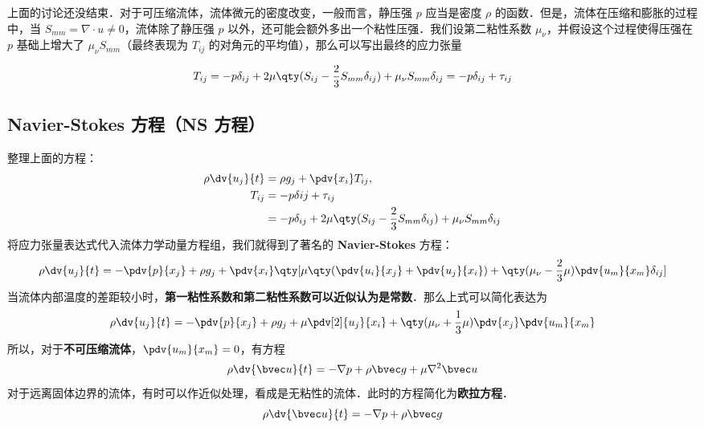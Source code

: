 上面的讨论还没结束．对于可压缩流体，流体微元的密度改变，一般而言，静压强 $p$ 应当是密度 $\rho$ 的函数．但是，流体在压缩和膨胀的过程中，当 $S_{mm}=\nabla\cdot u\neq 0$，流体除了静压强 $p$ 以外，还可能会额外多出一个粘性压强．我们设第二粘性系数 $\mu_\nu$，并假设这个过程使得压强在 $p$ 基础上增大了 $\mu_\nu S_{mm}$（最终表现为 $T_{ij}$ 的对角元的平均值），那么可以写出最终的应力张量

\begin{equation}\label{NSeq_eq1}
T_{ij}=-p\delta_{ij}+2\mu \qty(S_{ij}-\frac{2}{3}S_{mm}\delta_{ij})+\mu_\nu S_{mm} \delta_{ij}=-p\delta_{ij}+\tau_{ij}
\end{equation}

\subsection{Navier-Stokes 方程（NS 方程）}
整理上面的方程：
\begin{equation}
\begin{aligned}
\rho \dv{u_j}{t}&=\rho g_j+\pdv{x_i} T_{ij},\\
T_{ij}&=-p\delta{ij}+\tau_{ij}\\
&=-p\delta_{ij}+2\mu \qty(S_{ij}-\frac{2}{3}S_{mm}\delta_{ij})+\mu_\nu S_{mm} \delta_{ij}
\end{aligned}
\end{equation}
将应力张量表达式代入流体力学动量方程组，我们就得到了著名的 \textbf{Navier-Stokes} 方程：
\begin{equation}
\rho \dv{u_j}{t}=-\pdv{p}{x_j}+\rho g_j+\pdv{x_i} \qty[\mu\qty(\pdv{u_i}{x_j}+\pdv{u_j}{x_i})+\qty(\mu_\nu-\frac{2}{3}\mu)\pdv{u_m}{x_m}\delta_{ij}]
\end{equation}
当流体内部温度的差距较小时，\textbf{第一粘性系数和第二粘性系数可以近似认为是常数}．那么上式可以简化表达为
\begin{equation}\label{NSeq_eq2}
\rho \dv{u_j}{t}=-\pdv{p}{x_j}+\rho g_j+\mu\pdv[2]{u_j}{x_i} +\qty(\mu_\nu+\frac{1}{3}\mu)\pdv{x_j}\pdv{u_m}{x_m}
\end{equation}
所以，对于\textbf{不可压缩流体}，$\pdv{u_m}{x_m}=0$，有方程
\begin{equation}
\rho \dv{\bvec u}{t}=-\nabla p+\rho \bvec g+\mu \nabla^2 \bvec u
\end{equation}
对于远离固体边界的流体，有时可以作近似处理，看成是无粘性的流体．此时的方程简化为\textbf{欧拉方程}．
\begin{equation}
\rho \dv{\bvec u}{t}=-\nabla p+\rho \bvec g
\end{equation}
